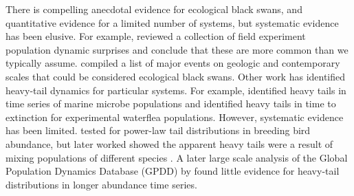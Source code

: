 There is compelling anecdotal evidence for ecological black swans, and
quantitative evidence for a limited number of systems, but systematic evidence
has been elusive. For example, \citet{doak2008} reviewed a collection of field
experiment population dynamic surprises and conclude that these are more common
than we typically assume. \citet{nunez2012} compiled a list of major events on
geologic and contemporary scales that could be considered ecological black
swans. Other work has identified heavy-tail dynamics for particular systems.
For example, \citet{segura2013} identified heavy tails in time series of marine
microbe populations and \citet{drake2014} identified heavy tails in time to
extinction for experimental waterflea populations. However, systematic evidence
has been limited. \citet{keitt1998} tested for power-law tail distributions in
breeding bird abundance, but later worked showed the apparent heavy tails were
a result of mixing populations of different species \citep{allen2001}. A later
large scale analysis of the Global Population Dynamics Database (GPDD) by
\citet{halley2002} found little evidence for heavy-tail distributions in longer
abundance time series.



